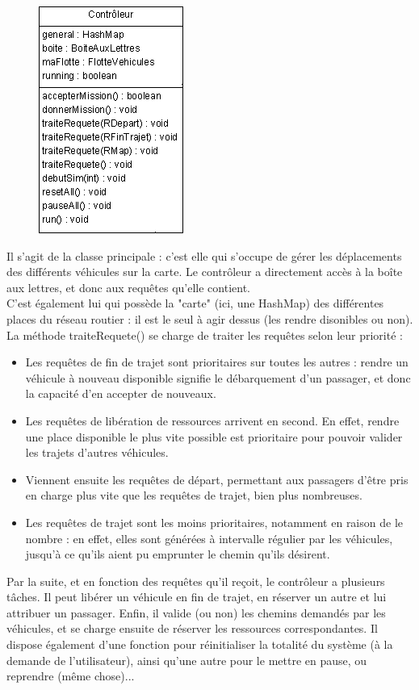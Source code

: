 \documentclass[a4paper, titlepage]{report}
\begin{document}
\begin{figure}
\includegraphics[scale=1]{Images/controleur.png}
\end{figure}Il s'agit de la classe principale : c'est elle qui s'occupe de gérer les déplacements des différents véhicules sur la carte. Le contrôleur a directement accès à la boîte aux lettres, et donc aux requêtes qu'elle contient.\\
C'est également lui qui possède la "carte" (ici, une HashMap) des différentes places du réseau routier : il est le seul à agir dessus (les rendre disonibles ou non).
La méthode traiteRequete() se charge de traiter les requêtes selon leur priorité :

 \begin{itemize}
      \item Les requêtes de fin de trajet sont prioritaires sur toutes les autres : rendre un véhicule à nouveau disponible signifie le débarquement d'un passager, et donc la capacité d'en accepter de nouveaux.
      \item Les requêtes de libération de ressources arrivent en second. En effet, rendre une place disponible le plus vite possible est prioritaire pour pouvoir valider les trajets d'autres véhicules.
      \item Viennent ensuite les requêtes de départ, permettant aux passagers d'être pris en charge plus vite que les requêtes de trajet, bien plus nombreuses.
      \item Les requêtes de trajet sont les moins prioritaires, notamment en raison de le nombre : en effet, elles sont générées à intervalle régulier par les véhicules, jusqu'à ce qu'ils aient pu emprunter le chemin qu'ils désirent.
      \end{itemize}

Par la suite, et en fonction des requêtes qu'il reçoit, le contrôleur a plusieurs tâches. Il peut libérer un véhicule en fin de trajet, en réserver un autre et lui attribuer un passager. Enfin, il valide (ou non) les chemins demandés par les véhicules, et se charge ensuite de réserver les ressources correspondantes.
Il dispose également d'une fonction pour réinitialiser la totalité du système (à la demande de l'utilisateur), ainsi qu'une autre pour le mettre en pause, ou reprendre (même chose)...
\end{document}
